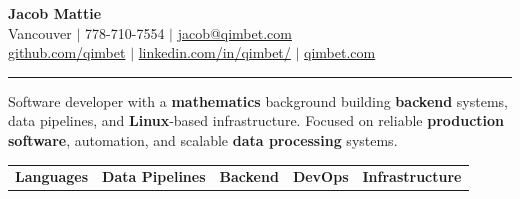 \documentclass[a4paper,10pt]{article}
\begin{document}
	\begin{center}
		{\huge \bfseries Jacob Mattie} \\[0.75em]
		Vancouver $|$ 778-710-7554 $|$ 
		\href{mailto:jacob@qimbet.com}{jacob@qimbet.com} \\
		[0.15em]
		
		\href{https://github.com/qimbet}{github.com/qimbet} $|$ 
		\href{https://www.linkedin.com/in/qimbet/}{linkedin.com/in/qimbet/}  $|$
		\href{https://www.qimbet.com}{qimbet.com}
		

		\noindent\rule{\textwidth}{0.4pt}

		\vspace{2.5mm}

		Software developer with a \textbf{mathematics} background building \textbf{backend} systems, data pipelines, and \textbf{Linux}-based infrastructure. Focused on reliable \textbf{production software}, automation, and scalable \textbf{data processing} systems.
		
		
		\vspace{1em}
		
		\noindent
		
		\begin{tabularx}{\linewidth}{@{}X|X|X|X|X@{}}
			
			\textbf{Languages} &
			\textbf{Data Pipelines} &
			\textbf{Backend} &
			\textbf{DevOps} &
			\textbf{Infrastructure} \\
			

\end{tabularx}
\end{center}
\end{document}
